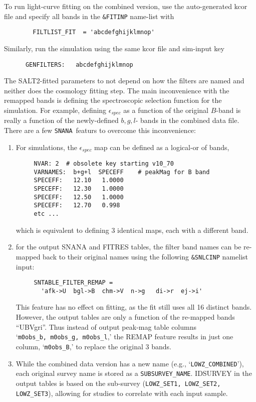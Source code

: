 \documentclass[12pt]{article}
\newcommand{\snana}{{\tt SNANA}}
\newcommand{\simeffspec}{\epsilon_{spec}}
\begin{document}
\noindent To run light-curve fitting on the combined version, 
use the auto-generated kcor file and specify all bands in the 
{\tt \&FITINP} name-list with
\begin{verbatim}
        FILTLIST_FIT  = 'abcdefghijklmnop'
\end{verbatim}
Similarly, run the simulation using the same kcor file and
sim-input key
\begin{verbatim}
      GENFILTERS:   abcdefghijklmnop
\end{verbatim}

The SALT2-fitted parameters to not depend on how the filters
are named and neither does the cosmology fitting step. The main
inconvenience with the remapped bands is defining the spectroscopic 
selection function for the simulation. For example, defining 
$\simeffspec$ as a function of the original $B$-band is 
really a function of the newly-defined $b,g,l$- bands in the 
combined data file. There are a few \snana\ featurs to overcome 
this inconvenience:
%
\begin{enumerate}
 \item  For simulations, the $\simeffspec$ map can be defined
   as a logical-or of bands,
    \vspace{-0.5cm} \begin{verbatim}
     NVAR: 2  # obsolete key starting v10_70
     VARNAMES:  b+g+l  SPECEFF    # peakMag for B band
     SPECEFF:   12.10   1.0000
     SPECEFF:   12.30   1.0000
     SPECEFF:   12.50   1.0000
     SPECEFF:   12.70   0.998
     etc ... 
    \end{verbatim}    \vspace{-0.8cm}
   which is equivalent to defining 3 identical maps, each
   with a different band.
%
  \item for the output SNANA and FITRES tables, the filter band 
        names can be re-mapped back to their original names
        using the following {\tt\&SNLCINP} namelist input: 
    \vspace{-0.5cm} \begin{verbatim}
     SNTABLE_FILTER_REMAP = 
       'afk->U  bgl->B  chm->V  n->g   di->r  ej->i'
    \end{verbatim}    \vspace{-0.8cm}
%
   This feature has no effect on fitting, as the fit still uses
   all 16 distinct bands. However, the output tables are only a 
   function of the re-mapped bands ``UBVgri''.  Thus instead of
   output peak-mag table columns `{\tt m0obs\_b,~m0obs\_g,~m0obs\_l},'
   the REMAP feature results in just one column, `{\tt m0obs\_B},' 
   to replace the original 3 bands. 
%
 \item While the combined data version has a new name 
   (e.g., `{\tt LOWZ\_COMBINED}'),
   each original survey name is stored as a {\tt SUBSURVEY\_NAME}. 
   IDSURVEY in the output tables is based on
   the sub-survey ({\tt LOWZ\_SET1, LOWZ\_SET2, LOWZ\_SET3}), 
   allowing for studies to correlate with each input sample.
%
\end{enumerate}
\end{document}
